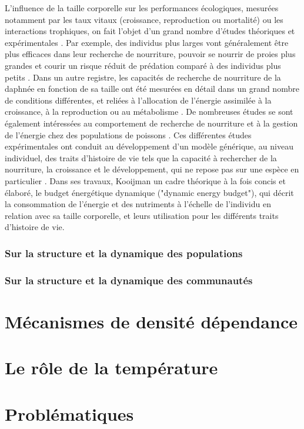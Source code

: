 L'influence de la taille corporelle sur les performances écologiques, mesurées
notamment par les taux vitaux (croissance, reproduction ou mortalité) ou les
interactions trophiques, on fait l'objet d'un grand nombre d'études théoriques
et expérimentales
\autocite[][,\ldots]{peters1986a,calder1996a,de-roos2001a,claessen2004a}. Par
exemple, des individus plus larges vont généralement être plus efficaces dans
leur recherche de nourriture, pouvoir se nourrir de proies plus grandes et
courir un risque réduit de prédation comparé à des individus plus petits
\autocite{paradis1996a}.
Dans un autre registre, les capacités de recherche de nourriture de la daphnée
en fonction de sa taille ont été mesurées en détail dans un grand nombre de
conditions différentes, et reliées à l'allocation de l'énergie assimilée à la
croissance, à la reproduction ou au métabolisme \autocite[par ex.
][]{lampert1978a,gurney1990a,mccauley1990a,kooijman2000a}. De nombreuses études
se sont également intéressées au comportement de recherche de nourriture et à la
gestion de l'énergie chez des populations de poissons \autocite[par ex.
][]{elliott1975a,mittelbach1981a,fuiman1994a,hjelm2001a}. Ces différentes études
expérimentales ont conduit au développement d'un modèle générique, au niveau
individuel, des traits d'histoire de vie tels que la capacité à rechercher de la
nourriture, la croissance et le développement, qui ne repose pas sur une espèce
en particulier \autocite{kooijman2000a,nisbet2000a,west2001a}. Dans ses travaux,
Kooijman \textcite{kooijman2000a} un cadre théorique à la fois concis et
élaboré, le budget énergétique dynamique ("dynamic energy budget"), qui décrit
la consommation  de l'énergie et des nutriments à l'échelle de l'individu en
relation avec sa taille corporelle, et leurs utilisation pour les différents
traits d'histoire de vie.

\subsubsection{Sur la structure et la dynamique des populations}

\subsubsection{Sur la structure et la dynamique des communautés}






\section{Mécanismes de densité dépendance}

\section{Le rôle de la température}

\section{Problématiques}	
